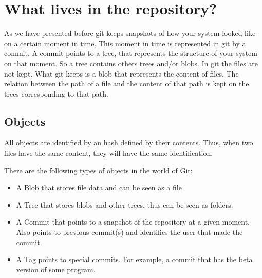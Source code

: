 \section{What lives in the repository?}

As we have presented before git keeps snapshots of how your system
looked like on a certain moment in time. This moment in time is
represented in git by a commit. A commit points to a tree, that
represents the structure of your system on that moment. So a tree
contains others trees and/or blobs. In git the files are not kept. 
What git keeps is a blob that represents the content of files. The
relation between the path of a file and the content of that path 
is kept on the trees corresponding to that path. \par

\subsection{Objects}
All objects are identified by an hash 
defined by their contents. Thus, when two files have the same
content, they will have the same identification. \par

There are the following types of objects in the world of Git:

\begin{itemize}
\item A Blob that stores file data and can be seen as a file
\item A Tree that stores blobs and other trees, thus can be seen as folders.
\item A Commit that points to a snapshot of the repository at a given moment.
Also points to previous commit(s) and identifies the user that made the commit.
\item A Tag points to special commits. For example, a commit that has the beta
version of some program.
\end{itemize}

